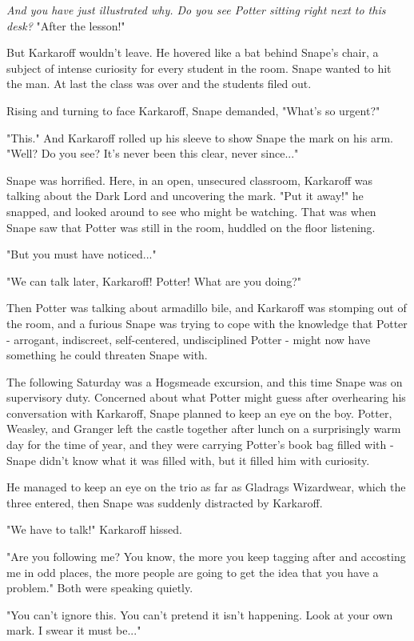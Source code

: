 \emph{And you have just illustrated why. Do you see Potter sitting right next to this desk?} "After the lesson!"

But Karkaroff wouldn't leave. He hovered like a bat behind Snape's chair, a subject of intense curiosity for every student in the room. Snape wanted to hit the man. At last the class was over and the students filed out.

Rising and turning to face Karkaroff, Snape demanded, "What's so urgent?"

"This." And Karkaroff rolled up his sleeve to show Snape the mark on his arm. "Well? Do you see? It's never been this clear, never since..."

Snape was horrified. Here, in an open, unsecured classroom, Karkaroff was talking about the Dark Lord and uncovering the mark. "Put it away!" he snapped, and looked around to see who might be watching. That was when Snape saw that Potter was still in the room, huddled on the floor listening.

"But you must have noticed..."

"We can talk later, Karkaroff! Potter! What are you doing?"

Then Potter was talking about armadillo bile, and Karkaroff was stomping out of the room, and a furious Snape was trying to cope with the knowledge that Potter - arrogant, indiscreet, self-centered, undisciplined Potter - might now have something he could threaten Snape with.

The following Saturday was a Hogsmeade excursion, and this time Snape was on supervisory duty. Concerned about what Potter might guess after overhearing his conversation with Karkaroff, Snape planned to keep an eye on the boy. Potter, Weasley, and Granger left the castle together after lunch on a surprisingly warm day for the time of year, and they were carrying Potter's book bag filled with - Snape didn't know what it was filled with, but it filled him with curiosity.

He managed to keep an eye on the trio as far as Gladrags Wizardwear, which the three entered, then Snape was suddenly distracted by Karkaroff.

"We have to talk!" Karkaroff hissed.

"Are you following me? You know, the more you keep tagging after and accosting me in odd places, the more people are going to get the idea that you have a problem." Both were speaking quietly.

"You can't ignore this. You can't pretend it isn't happening. Look at your own mark. I swear it must be..."

